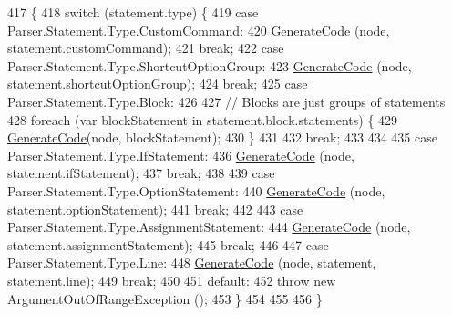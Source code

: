 \begin{DoxyCode}
417                                                                  \{
418             \textcolor{keywordflow}{switch} (statement.type) \{
419             \textcolor{keywordflow}{case} Parser.Statement.Type.CustomCommand:
420                 \hyperlink{a00034_a006f3becd521cc179ba3d3352f6f930b}{GenerateCode} (node, statement.customCommand);
421                 \textcolor{keywordflow}{break};
422             \textcolor{keywordflow}{case} Parser.Statement.Type.ShortcutOptionGroup:
423                 \hyperlink{a00034_a006f3becd521cc179ba3d3352f6f930b}{GenerateCode} (node, statement.shortcutOptionGroup);
424                 \textcolor{keywordflow}{break};
425             \textcolor{keywordflow}{case} Parser.Statement.Type.Block:
426                 
427                 \textcolor{comment}{// Blocks are just groups of statements}
428                 \textcolor{keywordflow}{foreach} (var blockStatement \textcolor{keywordflow}{in} statement.block.statements) \{
429                     \hyperlink{a00034_a006f3becd521cc179ba3d3352f6f930b}{GenerateCode}(node, blockStatement);
430                 \}
431 
432                 \textcolor{keywordflow}{break};
433 
434 
435             \textcolor{keywordflow}{case} Parser.Statement.Type.IfStatement:
436                 \hyperlink{a00034_a006f3becd521cc179ba3d3352f6f930b}{GenerateCode} (node, statement.ifStatement);
437                 \textcolor{keywordflow}{break};
438 
439             \textcolor{keywordflow}{case} Parser.Statement.Type.OptionStatement:
440                 \hyperlink{a00034_a006f3becd521cc179ba3d3352f6f930b}{GenerateCode} (node, statement.optionStatement);
441                 \textcolor{keywordflow}{break};
442 
443             \textcolor{keywordflow}{case} Parser.Statement.Type.AssignmentStatement:
444                 \hyperlink{a00034_a006f3becd521cc179ba3d3352f6f930b}{GenerateCode} (node, statement.assignmentStatement);
445                 \textcolor{keywordflow}{break};
446 
447             \textcolor{keywordflow}{case} Parser.Statement.Type.Line:
448                 \hyperlink{a00034_a006f3becd521cc179ba3d3352f6f930b}{GenerateCode} (node, statement, statement.line);
449                 \textcolor{keywordflow}{break};
450 
451             \textcolor{keywordflow}{default}:
452                 \textcolor{keywordflow}{throw} \textcolor{keyword}{new} ArgumentOutOfRangeException ();
453             \}
454 
455 
456         \}
\end{DoxyCode}
